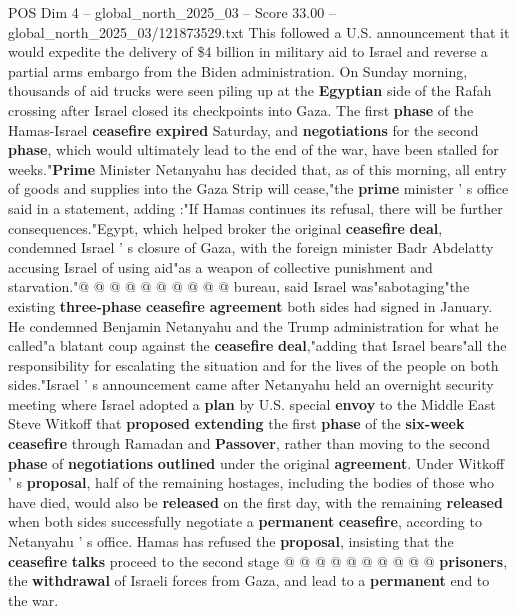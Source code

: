 \begin{textsample}{POS Dim 4 – global\_north\_2025\_03 – Score 33.00 – global\_north\_2025\_03/121873529.txt}  \label{ex:f4_pos_063}
This followed a U.S. announcement that it would expedite the delivery of \$4 billion in military aid to Israel and reverse a partial arms embargo from the Biden administration.
On Sunday morning, thousands of aid trucks were seen piling up at the \textbf{Egyptian} side of the Rafah crossing after Israel closed its checkpoints into Gaza.
The first \textbf{phase} of the Hamas-Israel \textbf{ceasefire} \textbf{expired} Saturday, and \textbf{negotiations} for the second \textbf{phase}, which would ultimately lead to the end of the war, have been stalled for weeks."\textbf{Prime} Minister Netanyahu has decided that, as of this morning, all entry of goods and supplies into the Gaza Strip will cease,"the \textbf{prime} minister ' s office said in a statement, adding :"If Hamas continues its refusal, there will be further consequences."Egypt, which helped broker the original \textbf{ceasefire} \textbf{deal}, condemned Israel ' s closure of Gaza, with the foreign minister Badr Abdelatty accusing Israel of using aid"as a weapon of collective punishment and starvation."@ @ @ @ @ @ @ @ @ @ bureau, said Israel was"sabotaging"the existing \textbf{three-phase} \textbf{ceasefire} \textbf{agreement} both sides had signed in January.
He condemned Benjamin Netanyahu and the Trump administration for what he called"a blatant coup against the \textbf{ceasefire} \textbf{deal},"adding that Israel bears"all the responsibility for escalating the situation and for the lives of the people on both sides."Israel ' s announcement came after Netanyahu held an overnight security meeting where Israel adopted a \textbf{plan} by U.S. special \textbf{envoy} to the Middle East Steve Witkoff that \textbf{proposed} \textbf{extending} the first \textbf{phase} of the \textbf{six-week} \textbf{ceasefire} through Ramadan and \textbf{Passover}, rather than moving to the second \textbf{phase} of \textbf{negotiations} \textbf{outlined} under the original \textbf{agreement}.
Under Witkoff ' s \textbf{proposal}, half of the remaining hostages, including the bodies of those who have died, would also be \textbf{released} on the first day, with the remaining \textbf{released} when both sides successfully negotiate a \textbf{permanent} \textbf{ceasefire}, according to Netanyahu ' s office.
Hamas has refused the \textbf{proposal}, insisting that the \textbf{ceasefire} \textbf{talks} proceed to the second stage @ @ @ @ @ @ @ @ @ @ \textbf{prisoners}, the \textbf{withdrawal} of Israeli forces from Gaza, and lead to a \textbf{permanent} end to the war.

\end{textsample}
